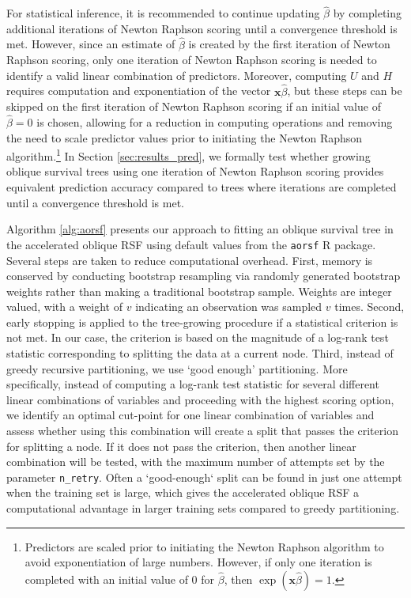 \documentclass{article}\usepackage[]{graphicx}\usepackage[]{xcolor}
\newcommand{\secref}[1]{Section \ref{#1}}
\begin{document}
For statistical inference, it is recommended to continue updating $\hat{\beta}$ by completing additional iterations of Newton Raphson scoring until a convergence threshold is met. However, since an estimate of $\hat{\beta}$ is created by the first iteration of Newton Raphson scoring, only one iteration of Newton Raphson scoring is needed to identify a valid linear combination of predictors. Moreover, computing $U$ and $H$ requires computation and exponentiation of the vector $\bm{x}\hat{\beta}$, but these steps can be skipped on the first iteration of Newton Raphson scoring if an initial value of $\hat{\beta} = 0$ is chosen, allowing for a reduction in computing operations and removing the need to scale predictor values prior to initiating the Newton Raphson algorithm.\footnote{Predictors are scaled prior to initiating the Newton Raphson algorithm to avoid exponentiation of large numbers. However, if only one iteration is completed with an initial value of 0 for $\hat{\beta}$, then $\exp(\bm{x}\hat{\beta}) = 1$.} In \secref{sec:results_pred}, we formally test whether growing oblique survival trees using one iteration of Newton Raphson scoring provides equivalent prediction accuracy compared to trees where iterations are completed until a convergence threshold is met.

Algorithm \ref{alg:aorsf} presents our approach to fitting an oblique survival tree in the accelerated oblique RSF using default values from the \texttt{aorsf} R package. Several steps are taken to reduce computational overhead. First, memory is conserved by conducting bootstrap resampling via randomly generated bootstrap weights rather than making a traditional bootstrap sample. Weights are integer valued, with a weight of $v$ indicating an observation was sampled $v$ times. Second, early stopping is applied to the tree-growing procedure if a statistical criterion is not met. In our case, the criterion is based on the magnitude of a log-rank test statistic corresponding to splitting the data at a current node. Third, instead of greedy recursive partitioning, we use `good enough' partitioning. More specifically, instead of computing a log-rank test statistic for several different linear combinations of variables and proceeding with the highest scoring option, we identify an optimal cut-point for one linear combination of variables and assess whether using this combination will create a split that passes the criterion for splitting a node. If it does not pass the criterion, then another linear combination will be tested, with the maximum number of attempts set by the parameter \texttt{n\_retry}. Often a `good-enough` split can be found in just one attempt when the training set is large, which gives the accelerated oblique RSF a computational advantage in larger training sets compared to greedy partitioning.
\end{document}
